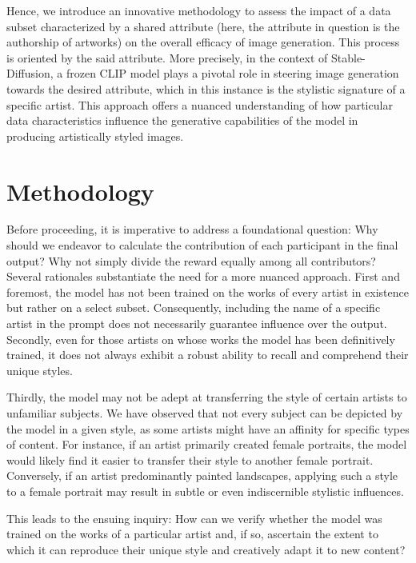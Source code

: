 \documentclass[12pt, letterpaper]{article}
\begin{document}
Hence, we introduce an innovative methodology to assess the impact of a data subset characterized by a shared attribute (here, the attribute in question is the authorship of artworks) on the overall efficacy of image generation. This process is oriented by the said attribute. More precisely, in the context of Stable-Diffusion, a frozen CLIP model plays a pivotal role in steering image generation towards the desired attribute, which in this instance is the stylistic signature of a specific artist. This approach offers a nuanced understanding of how particular data characteristics influence the generative capabilities of the model in producing artistically styled images.

\section{Methodology}

Before proceeding, it is imperative to address a foundational question: Why should we endeavor to calculate the contribution of each participant in the final output? Why not simply divide the reward equally among all contributors? Several rationales substantiate the need for a more nuanced approach. First and foremost, the model has not been trained on the works of every artist in existence but rather on a select subset. Consequently, including the name of a specific artist in the prompt does not necessarily guarantee influence over the output. Secondly, even for those artists on whose works the model has been definitively trained, it does not always exhibit a robust ability to recall and comprehend their unique styles.

Thirdly, the model may not be adept at transferring the style of certain artists to unfamiliar subjects. We have observed that not every subject can be depicted by the model in a given style, as some artists might have an affinity for specific types of content. For instance, if an artist primarily created female portraits, the model would likely find it easier to transfer their style to another female portrait. Conversely, if an artist predominantly painted landscapes, applying such a style to a female portrait may result in subtle or even indiscernible stylistic influences.

This leads to the ensuing inquiry: How can we verify whether the model was trained on the works of a particular artist and, if so, ascertain the extent to which it can reproduce their unique style and creatively adapt it to new content?
\end{document}
